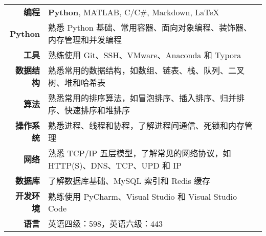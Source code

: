 %

\begin{table}[!htbp]
    \begin{tabular}{rl}
        \icon{\faCode} \textbf{编程} & \textbf{Python}, MATLAB, C/C\#, Markdown, \LaTeX \\
        \textbf{Python} & 熟悉 Python 基础、常用容器、面向对象编程、装饰器、内存管理和并发编程 \\
        \icon{\faTools} \textbf{工具} & 熟练使用 Git、SSH、VMware、Anaconda 和 Typora \\
        \textbf{数据结构} & 熟悉常用的数据结构，如数组、链表、栈、队列、二叉树、堆和哈希表 \\
        \icon{\faSortAmountUpAlt} \textbf{算法} & 熟悉常用的排序算法，如冒泡排序、插入排序、归并排序、快速排序和堆排序 \\
        \textbf{操作系统} & 熟悉进程、线程和协程，了解进程间通信、死锁和内存管理 \\
        \icon{\faNetworkWired} \textbf{网络} & 熟悉 TCP/IP 五层模型，了解常见的网络协议，如 HTTP(S)、DNS、TCP、UPD 和 IP \\
        \textbf{数据库} & 了解数据库基础、MySQL 索引和 Redis 缓存 \\
        \textbf{开发环境} & 熟练使用 PyCharm、Visual Studio 和 Visual Studio Code \\
        
        \icon{\faLanguage} \textbf{语言} & 英语四级：598，英语六级：443 
    \end{tabular}
\end{table} 